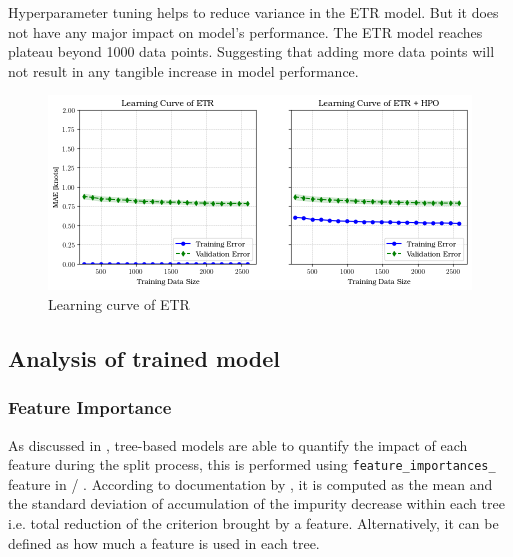 Hyperparameter tuning helps to reduce variance in the ETR model. But it does not have any major impact on model's performance. The ETR model reaches plateau beyond 1000 data points. Suggesting that adding more data points will not result in any tangible increase in model performance.\\

\begin{figure}[h]
    \centering
        \includegraphics[width=.95\textwidth]{02_figures/learning_curve_etr_mae.png}
        \caption{Learning curve of ETR}
        \label{fig:learn_curve_ETR_MAE}
\end{figure}

\subsection{Analysis of trained model}\label{sec:BBM_model_eval}

\subsubsection{Feature Importance}\label{sec:feature_importance_bbm}

As discussed in , tree-based models are able to quantify the impact of each feature during the split process, this is performed using {\tt feature\_importances\_} feature in \scikit/ . According to documentation by , it is computed as the mean and the standard deviation of accumulation of the impurity decrease within each tree i.e. total reduction of the criterion brought by a feature. Alternatively, it can be defined as how much a feature is used in each tree.\\

